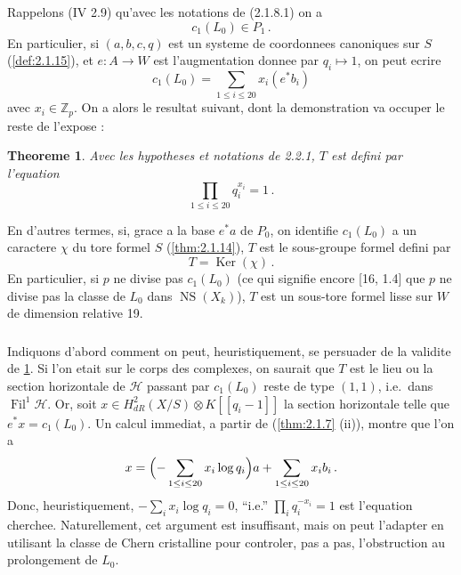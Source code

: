 \documentclass[12pt,a4paper]{article}
\theoremstyle{plain}
\newtheorem{theorem}{Theoreme}[section]
\theoremstyle{definition}
\theoremstyle{remark}
\DeclareMathOperator{\Ker}{Ker}
\DeclareMathOperator{\Fil}{Fil}
\DeclareMathOperator{\NS}{NS}
\begin{document}
Rappelons (IV 2.9) qu'avec les notations de (2.1.8.1) on a
\begin{equation}\label{eq:2.2.1.2}
c_1(L_0) \in P_1\,.\end{equation}
En particulier, si $(a, b, c, q)$ est un systeme de coordonnees canoniques sur $S$ (\ref{def:2.1.15}), et $e : A \to W$ est l'augmentation donnee par $q_i \mapsto 1$, on peut ecrire
\begin{equation}\label{eq:2.2.1.3}
c_1(L_0) = \sum_{1 \leq i \leq 20} x_i (e^*b_i)\end{equation}
avec $x_i \in \mathbb{Z}_p$. On a alors le resultat suivant, dont la demonstration va occuper le reste de l'expose :

\begin{theorem}\label{thm:2.2.2}
Avec les hypotheses et notations de \emph{2.2.1}, $T$ est defini par l'equation
\begin{equation}\label{eq:2.2.2.1}
\prod_{1 \leq i \leq 20} q_i^{x_i} = 1\,.\end{equation}
\end{theorem}

En d'autres termes, si, grace a la base $e^*a$ de $P_0$, on identifie $c_1(L_0)$ a un caractere $\chi$ du tore formel $S$ (\ref{thm:2.1.14}), $T$ est le sous-groupe formel defini par
\begin{equation}\label{eq:2.2.2.2}
T = \Ker(\chi)\,.\end{equation}
En particulier, si $p$ ne divise pas $c_1(L_0)$ (ce qui signifie encore [16, 1.4] que $p$ ne divise pas la classe de $L_0$ dans $\NS(X_k)$), $T$ est un sous-tore formel lisse sur $W$ de dimension relative 19.

\subsubsection{}

Indiquons d'abord comment on peut, heuristiquement, se persuader de la validite de \ref{thm:2.2.2}. Si l'on etait sur le corps des complexes, on saurait que $T$ est le lieu ou la section horizontale de $\mathcal{H}$ passant par $c_1(L_0)$ reste de type $(1,1)$, i.e.\ dans $\Fil^1\mathcal{H}$. Or, soit $x \in H_{dR}^2(X/S) \otimes K[[q_i - 1]]$ la section horizontale telle que $e^*x = c_1(L_0)$. Un calcul immediat, a partir de (\ref{thm:2.1.7} (ii)), montre que l'on a
\begin{equation}\label{eq:2.2.3.1}
x = \Bigl(-\sum_{1 \leq i \leq 20} x_i \log q_i\Bigr)a + \sum_{1 \leq i \leq 20} x_i b_i\,.\end{equation}
Donc, heuristiquement, $-\sum_i x_i \log q_i = 0$, ``i.e.'' $\prod_i q_i^{-x_i} = 1$ est l'equation cherchee. Naturellement, cet argument est insuffisant, mais on peut l'adapter en utilisant la classe de Chern cristalline pour controler, pas a pas, l'obstruction au prolongement de $L_0$.
\end{document}
